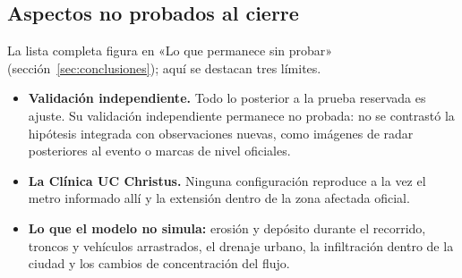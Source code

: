\subsection{Aspectos no probados al cierre}
La lista completa figura en «Lo que permanece sin probar» (sección~\ref{sec:conclusiones}); aquí se destacan tres límites.
\begin{itemize}
\item \textbf{Validación independiente.} Todo lo posterior a la prueba reservada es ajuste. Su validación independiente permanece no probada: no se contrastó la hipótesis integrada con observaciones nuevas, como imágenes de radar posteriores al evento o marcas de nivel oficiales.
\item \textbf{La Clínica UC Christus.} Ninguna configuración reproduce a la vez el metro informado allí y la extensión dentro de la zona afectada oficial.
\item \textbf{Lo que el modelo no simula:} erosión y depósito durante el recorrido, troncos y vehículos arrastrados, el drenaje urbano, la infiltración dentro de la ciudad y los cambios de concentración del flujo.
\end{itemize}

